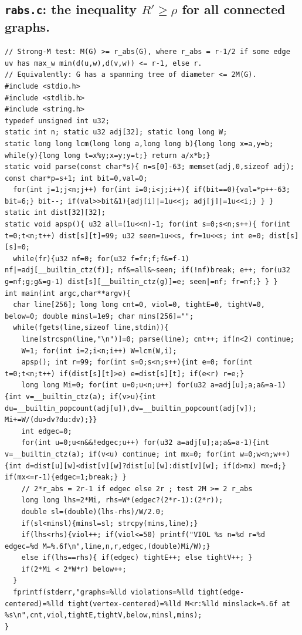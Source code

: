 \documentclass[11pt]{amsart}
\theoremstyle{definition}
\newcommand{\Rp}{R'}
\begin{document}
\subsection*{\texttt{rabs.c}: the inequality \texorpdfstring{$\Rp\ge\rho$}{R' >= rho} for all connected graphs.}
\begin{lstlisting}
// Strong-M test: M(G) >= r_abs(G), where r_abs = r-1/2 if some edge uv has max_w min(d(u,w),d(v,w)) <= r-1, else r.
// Equivalently: G has a spanning tree of diameter <= 2M(G).
#include <stdio.h>
#include <stdlib.h>
#include <string.h>
typedef unsigned int u32;
static int n; static u32 adj[32]; static long long W;
static long long lcm(long long a,long long b){long long x=a,y=b; while(y){long long t=x%y;x=y;y=t;} return a/x*b;}
static void parse(const char*s){ n=s[0]-63; memset(adj,0,sizeof adj); const char*p=s+1; int bit=0,val=0;
  for(int j=1;j<n;j++) for(int i=0;i<j;i++){ if(bit==0){val=*p++-63; bit=6;} bit--; if(val>>bit&1){adj[i]|=1u<<j; adj[j]|=1u<<i;} } }
static int dist[32][32];
static void apsp(){ u32 all=(1u<<n)-1; for(int s=0;s<n;s++){ for(int t=0;t<n;t++) dist[s][t]=99; u32 seen=1u<<s, fr=1u<<s; int e=0; dist[s][s]=0;
  while(fr){u32 nf=0; for(u32 f=fr;f;f&=f-1) nf|=adj[__builtin_ctz(f)]; nf&=all&~seen; if(!nf)break; e++; for(u32 g=nf;g;g&=g-1) dist[s][__builtin_ctz(g)]=e; seen|=nf; fr=nf;} } }
int main(int argc,char**argv){
  char line[256]; long long cnt=0, viol=0, tightE=0, tightV=0, below=0; double minsl=1e9; char mins[256]="";
  while(fgets(line,sizeof line,stdin)){
    line[strcspn(line,"\n")]=0; parse(line); cnt++; if(n<2) continue;
    W=1; for(int i=2;i<n;i++) W=lcm(W,i);
    apsp(); int r=99; for(int s=0;s<n;s++){int e=0; for(int t=0;t<n;t++) if(dist[s][t]>e) e=dist[s][t]; if(e<r) r=e;}
    long long Mi=0; for(int u=0;u<n;u++) for(u32 a=adj[u];a;a&=a-1){int v=__builtin_ctz(a); if(v>u){int du=__builtin_popcount(adj[u]),dv=__builtin_popcount(adj[v]); Mi+=W/(du>dv?du:dv);}}
    int edgec=0;
    for(int u=0;u<n&&!edgec;u++) for(u32 a=adj[u];a;a&=a-1){int v=__builtin_ctz(a); if(v<u) continue; int mx=0; for(int w=0;w<n;w++){int d=dist[u][w]<dist[v][w]?dist[u][w]:dist[v][w]; if(d>mx) mx=d;} if(mx<=r-1){edgec=1;break;} }
    // 2*r_abs = 2r-1 if edgec else 2r ; test 2M >= 2 r_abs
    long long lhs=2*Mi, rhs=W*(edgec?(2*r-1):(2*r));
    double sl=(double)(lhs-rhs)/W/2.0;
    if(sl<minsl){minsl=sl; strcpy(mins,line);}
    if(lhs<rhs){viol++; if(viol<=50) printf("VIOL %s n=%d r=%d edgec=%d M=%.6f\n",line,n,r,edgec,(double)Mi/W);}
    else if(lhs==rhs){ if(edgec) tightE++; else tightV++; }
    if(2*Mi < 2*W*r) below++;
  }
  fprintf(stderr,"graphs=%lld violations=%lld tight(edge-centered)=%lld tight(vertex-centered)=%lld M<r:%lld minslack=%.6f at %s\n",cnt,viol,tightE,tightV,below,minsl,mins);
}
\end{lstlisting}
\end{document}
